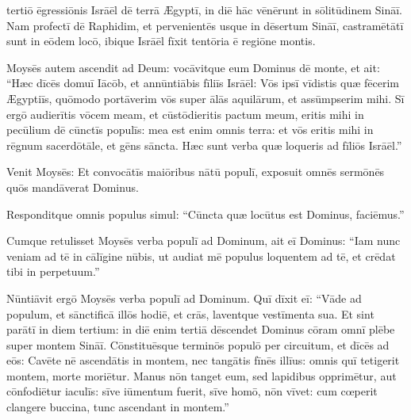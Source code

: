 

\thispagestyle{empty}

 tertiō ēgressiōnis Isrāēl dē
terrā Ægyptī, in diē hāc vēnērunt in sōlitūdinem Sināī. 
Nam profectī dē Raphidim, et pervenientēs usque in dēsertum Sināī,
castramētātī sunt in eōdem locō, ibique
Isrāēl fīxit tentōria ē regiōne montis. 

Moysēs autem ascendit ad Deum: vocāvitque eum Dominus dē
monte, et ait: ``Hæc dīcēs domuī Iācōb, et
annūntiābis fīliīs Isrāēl: 
Vōs ipsī vīdistis quæ fēcerim
Ægyptiīs, quōmodo portāverim vōs super ālās aquilārum, et assūmpserim mihi.
Sī ergō audierītis vōcem meam, et cūstōdieritis pactum meum, eritis mihi in pecūlium dē
cūnctīs populīs: mea est enim omnis terra: 
et vōs eritis mihi in
rēgnum sacerdōtāle, et gēns
sāncta. Hæc sunt verba quæ loqueris ad fīliōs
Isrāēl.''

Venit Moysēs: Et convocātīs maiōribus nātū populī, exposuit
omnēs sermōnēs quōs mandāverat Dominus. 

Responditque omnis populus simul: ``Cūn\-cta quæ
locūtus est Dominus, faciēmus.''

Cumque retulisset Moysēs verba populī ad
Dominum, ait eī Dominus: ``Iam nunc veniam ad tē in
cālīgine nūbis, ut audiat mē populus loquentem ad tē, et
crēdat tibi in perpetuum.''


Nūntiāvit ergō Moysēs verba populī ad Dominum.  Quī dīxit eī: ``Vāde ad populum, et sānctificā illōs hodiē, et crās, laventque vestīmenta sua. 
Et sint parātī in diem tertium: in diē enim tertiā dēscendet Dominus cōram
omnī plēbe super montem Sināī. 
Cōnstituēs\-que terminōs populō per circuitum, et dīcēs ad eōs: Cavēte nē
ascendātis in montem, nec tangātis fīnēs illīus: omnis quī tetigerit
montem, morte moriētur.
Manus nōn tanget eum, sed
lapidibus opprimētur, aut cōnfodiētur iaculīs:
sīve iūmentum fuerit, sīve homō, nōn vīvet: cum cœperit
clangere buccina, tunc ascendant in montem.''

